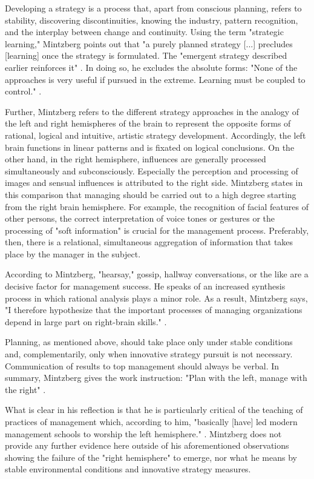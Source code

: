 \documentclass[a4paper,12pt]{article}
\begin{document}
Developing a strategy is a process that, apart from conscious planning, refers
to stability, discovering discontinuities, knowing the industry, pattern
recognition, and the interplay between change and continuity. Using the term
"strategic learning," Mintzberg points out that "a purely planned strategy
[...] precludes [learning] once the strategy is formulated. The "emergent
strategy described earlier reinforces it" \cite[p. 45]{Mintzberg}. In doing
so, he excludes the absolute forms: "None of the approaches is very useful if
pursued in the extreme. Learning must be coupled to control."
\cite[p. 45]{Mintzberg}.

Further, Mintzberg refers to the different strategy approaches in the analogy
of the left and right hemispheres of the brain to represent the opposite forms
of rational, logical and intuitive, artistic strategy development.
Accordingly, the left brain functions in linear patterns and is fixated on
logical conclusions. On the other hand, in the right hemisphere, influences
are generally processed simultaneously and subconsciously. Especially the
perception and processing of images and sensual influences is attributed to
the right side. Mintzberg states in this comparison that managing should be
carried out to a high degree starting from the right brain hemisphere. For
example, the recognition of facial features of other persons, the correct
interpretation of voice tones or gestures or the processing of "soft
information" is crucial for the management process. Preferably, then, there is
a relational, simultaneous aggregation of information that takes place by the
manager in the subject.

According to Mintzberg, "hearsay," gossip, hallway conversations, or the like
are a decisive factor for management success. He speaks of an increased
synthesis process in which rational analysis plays a minor role. As a result,
Mintzberg says, "I therefore hypothesize that the important processes of
managing organizations depend in large part on right-brain skills."
\cite[p. 63]{Mintzberg}.

Planning, as mentioned above, should take place only under stable conditions
and, complementarily, only when innovative strategy pursuit is not necessary.
Communication of results to top management should always be verbal. In
summary, Mintzberg gives the work instruction: "Plan with the left, manage
with the right" \cite[p. 57]{Mintzberg}.

What is clear in his reflection is that he is particularly critical of the
teaching of practices of management which, according to him, "basically [have]
led modern management schools to worship the left hemisphere."
\cite[p. 68]{Mintzberg}. Mintzberg does not provide any further evidence here
outside of his aforementioned observations showing the failure of the "right
hemisphere" to emerge, nor what he means by stable environmental conditions
and innovative strategy measures.
\end{document}
